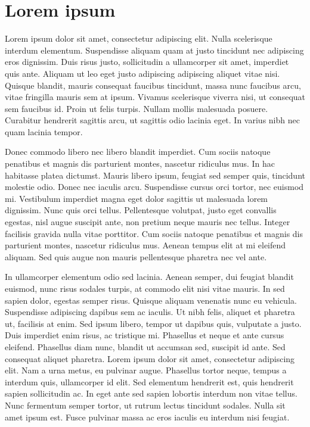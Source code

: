 \chapter{Lorem ipsum}
\label{cha:lorem-ipsum}

Lorem ipsum dolor sit amet, consectetur adipiscing elit. Nulla
scelerisque interdum elementum. Suspendisse aliquam quam at justo
tincidunt nec adipiscing eros dignissim. Duis risus justo,
sollicitudin a ullamcorper sit amet, imperdiet quis ante. Aliquam ut
leo eget justo adipiscing adipiscing aliquet vitae nisi. Quisque
blandit, mauris consequat faucibus tincidunt, massa nunc faucibus
arcu, vitae fringilla mauris sem at ipsum. Vivamus scelerisque viverra
nisi, ut consequat sem faucibus id. Proin ut felis turpis. Nullam
mollis malesuada posuere. Curabitur hendrerit sagittis arcu, ut
sagittis odio lacinia eget. In varius nibh nec quam lacinia tempor.

Donec commodo libero nec libero blandit imperdiet. Cum sociis natoque
penatibus et magnis dis parturient montes, nascetur ridiculus mus. In
hac habitasse platea dictumst. Mauris libero ipsum, feugiat sed semper
quis, tincidunt molestie odio. Donec nec iaculis arcu. Suspendisse
cursus orci tortor, nec euismod mi. Vestibulum imperdiet magna eget
dolor sagittis ut malesuada lorem dignissim. Nunc quis orci
tellus. Pellentesque volutpat, justo eget convallis egestas, nisl
augue suscipit ante, non pretium neque mauris nec tellus. Integer
facilisis gravida nulla vitae porttitor. Cum sociis natoque penatibus
et magnis dis parturient montes, nascetur ridiculus mus. Aenean tempus
elit at mi eleifend aliquam. Sed quis augue non mauris pellentesque
pharetra nec vel ante.

In ullamcorper elementum odio sed lacinia. Aenean semper, dui feugiat
blandit euismod, nunc risus sodales turpis, at commodo elit nisi vitae
mauris. In sed sapien dolor, egestas semper risus. Quisque aliquam
venenatis nunc eu vehicula. Suspendisse adipiscing dapibus sem ac
iaculis. Ut nibh felis, aliquet et pharetra ut, facilisis at enim. Sed
ipsum libero, tempor ut dapibus quis, vulputate a justo. Duis
imperdiet enim risus, ac tristique mi. Phasellus et neque et ante
cursus eleifend. Phasellus diam nunc, blandit ut accumsan sed,
suscipit id ante. Sed consequat aliquet pharetra. Lorem ipsum dolor
sit amet, consectetur adipiscing elit. Nam a urna metus, eu pulvinar
augue. Phasellus tortor neque, tempus a interdum quis, ullamcorper id
elit. Sed elementum hendrerit est, quis hendrerit sapien sollicitudin
ac. In eget ante sed sapien lobortis interdum non vitae tellus. Nunc
fermentum semper tortor, ut rutrum lectus tincidunt sodales. Nulla sit
amet ipsum est. Fusce pulvinar massa ac eros iaculis eu interdum nisi
feugiat.

